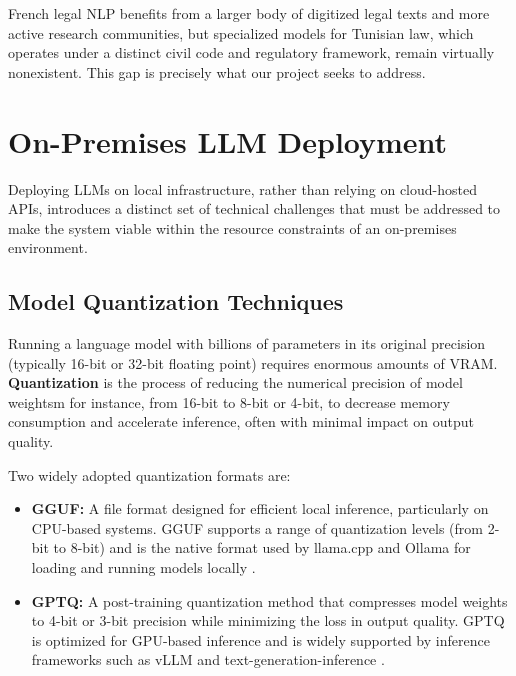 French legal \ac{NLP} benefits from a larger body of digitized legal texts
and more active research communities, but specialized models for Tunisian
law, which operates under a distinct civil code and regulatory framework,
remain virtually nonexistent. This gap is precisely what our project seeks
to address.

\section{On-Premises LLM Deployment}
\label{sec:onpremises}

Deploying \ac{LLM}s on local infrastructure, rather than relying on
cloud-hosted \ac{API}s, introduces a distinct set of technical challenges
that must be addressed to make the system viable within the resource
constraints of an on-premises environment.

\subsection{Model Quantization Techniques}

Running a language model with billions of parameters in its original
precision (typically 16-bit or 32-bit floating point) requires enormous
amounts of \ac{VRAM}. \textbf{Quantization} is the process of reducing
the numerical precision of model weightsm for instance, from 16-bit
to 8-bit or 4-bit, to decrease memory consumption and accelerate
inference, often with minimal impact on output quality.

Two widely adopted quantization formats are:

\begin{itemize}
    \item \textbf{\ac{GGUF}:} A file format designed for efficient local
    inference, particularly on \ac{CPU}-based systems. \ac{GGUF} supports
    a range of quantization levels (from 2-bit to 8-bit) and is the
    native format used by llama.cpp and Ollama for loading and running
    models locally \cite{ollama2024docs}.

    \item \textbf{\ac{GPTQ}:} A post-training quantization method that
    compresses model weights to 4-bit or 3-bit precision while minimizing
    the loss in output quality. \ac{GPTQ} is optimized for \ac{GPU}-based
    inference and is widely supported by inference frameworks such as
    vLLM and text-generation-inference \cite{frantar2022gptq}.
\end{itemize}

